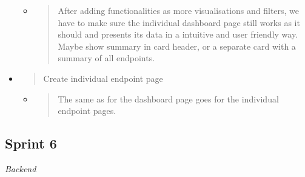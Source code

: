 \begin{itemize}
  \begin{itemize}
  \item
    \begin{quote}
    After adding functionalities as more visualisations and filters, we
    have to make sure the individual dashboard page still works as it
    should and presents its data in a intuitive and user friendly way.
    Maybe show summary in card header, or a separate card with a summary
    of all endpoints.
    \end{quote}
  \end{itemize}
\item
  \begin{quote}
  Create individual endpoint page
  \end{quote}

  \begin{itemize}
  \item
    \begin{quote}
    The same as for the dashboard page goes for the individual endpoint
    pages.
    \end{quote}
  \end{itemize}
\end{itemize}

\hypertarget{sprint-6-1}{%
\subsection{Sprint 6}\label{sprint-6-1}}

\emph{Backend}

